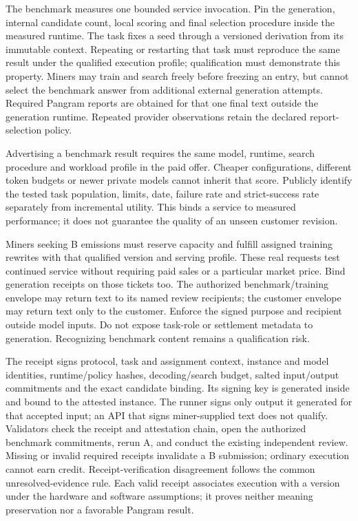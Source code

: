 The benchmark measures one bounded service invocation. Pin the generation,
internal candidate count, local scoring and final selection procedure
inside the measured runtime. The task fixes a seed through a versioned
derivation from its immutable context. Repeating or restarting that task
must reproduce the same result under the qualified execution profile;
qualification must demonstrate this property. Miners may train and search
freely before freezing an entry, but cannot select the benchmark answer
from additional external generation attempts. Required Pangram reports
are obtained for that one final text outside the generation runtime.
Repeated provider observations retain the declared report-selection policy.

Advertising a benchmark result requires the same model, runtime, search
procedure and workload profile in the paid offer. Cheaper configurations,
different token budgets or newer private models cannot inherit that score.
Publicly identify the tested task population, limits, date, failure rate
and strict-success rate separately from incremental utility. This binds
a service to measured performance; it does not guarantee the quality of
an unseen customer revision.

Miners seeking B emissions must reserve capacity and fulfill assigned
training rewrites with that qualified version and serving profile. These
real requests test continued service without requiring paid sales or a
particular market price. Bind generation receipts on those tickets too.
The authorized benchmark/training envelope may return text to its named
review recipients; the customer envelope may return text only to the
customer. Enforce the signed purpose and recipient outside model inputs.
Do not expose task-role or settlement metadata to generation. Recognizing
benchmark content remains a qualification risk.

The receipt signs protocol, task and assignment context, instance and
model identities, runtime/policy hashes, decoding/search budget, salted
input/output commitments and the exact candidate binding. Its signing key
is generated inside and bound to the attested instance. The runner signs
only output it generated for that accepted input; an API that signs
miner-supplied text does not qualify. Validators check the receipt and
attestation chain, open the authorized benchmark commitments, rerun A,
and conduct the existing independent review. Missing or invalid required
receipts invalidate a B submission; ordinary execution cannot earn credit. Receipt-verification disagreement
follows the common unresolved-evidence rule. Each valid receipt associates
execution with a version under the hardware and software assumptions;
it proves neither meaning preservation nor a favorable Pangram result.

